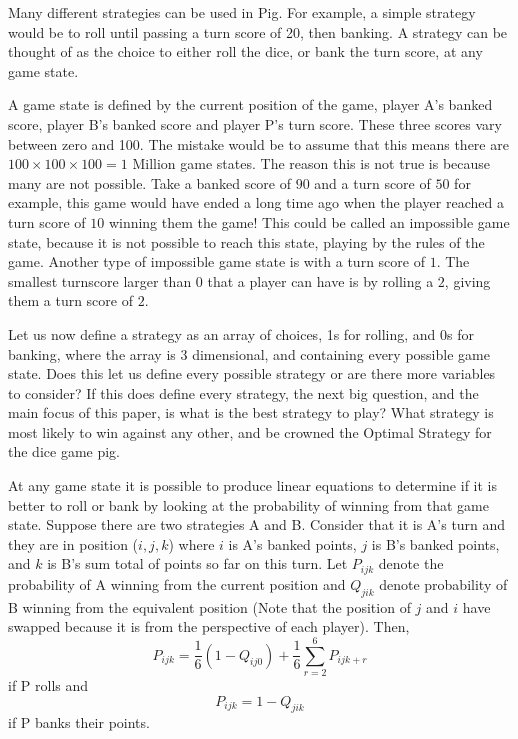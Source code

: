 \documentclass[a4paper,titlepage]{article}
\begin{document}
Many different strategies can be used in Pig. For example, a simple strategy would be to roll until passing a turn score of 20, then banking. A strategy can be thought of as the choice to either roll the dice, or bank the turn score, at any game state.

A game state is defined by the current position of the game, player A's banked score, player B's banked score and player P's turn score. These three scores vary between zero and 100. The mistake would be to assume that this means there are $100\times100\times100 = 1$ Million game states. The reason this is not true is because many are not possible. Take a banked score of $90$ and a turn score of $50$ for example, this game would have ended a long time ago when the player reached a turn score of $10$ winning them the game! This could be called an impossible game state, because it is not possible to reach this state, playing by the rules of the game. Another type of impossible game state is with a turn score of $1$. The smallest turnscore larger than $0$ that a player can have is by rolling a $2$, giving them a turn score of $2$.

Let us now define a strategy as an array of choices, 1s for rolling, and 0s for banking, where the array is 3 dimensional, and containing every possible game state. Does this let us define every possible strategy or are there more variables to consider? If this does define every strategy, the next big question, and the main focus of this paper, is what is the best strategy to play? What strategy is most likely to win against any other, and be crowned the Optimal Strategy for the dice game pig.

At any game state it is possible to produce linear equations to determine if it is better to roll or bank by looking at the probability of winning from that game state. Suppose there are two strategies A and B. Consider that it is A's turn and they are in position ($i,j,k$) where $i$ is A's banked points, $j$ is B's banked points, and $k$ is B's sum total of points so far on this turn. Let $P_{ijk}$ denote the probability of A winning from the current position and $Q_{jik}$ denote probability of B winning from the equivalent position (Note that the position of $j$ and $i$ have swapped because it is from the perspective of each player). Then,
\begin{equation}\label{1.2.1.a}
P_{ijk} = \dfrac{1}{6} (1-Q_{ij0}) + \dfrac{1}{6}\sum^{6}_{r=2}P_{ijk+r}
\end{equation}
if P rolls and
\begin{equation}\label{1.2.1.b}
P_{ijk} = 1-Q_{jik}
\end{equation}
if P banks their points.
\end{document}
